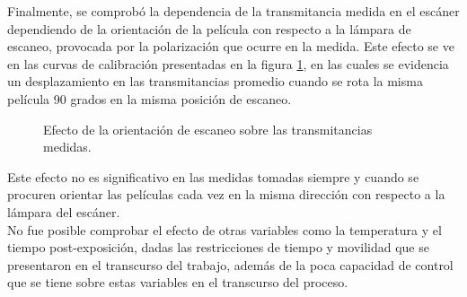 Finalmente, se comprobó la dependencia de la transmitancia medida en el escáner dependiendo de la orientación de la película con respecto a la lámpara de escaneo, provocada por la polarización que ocurre en la medida. Este efecto se ve en las curvas de calibración presentadas en la figura \ref{fig:efectoOrientacion}, en las cuales se evidencia un desplazamiento en las transmitancias promedio cuando se rota la misma película 90 grados en la misma posición de escaneo.\\
\begin{figure}[H]
	\centering
	\hfill
	\caption{Efecto de la orientación de escaneo sobre las transmitancias medidas.}
	\label{fig:efectoOrientacion}
\end{figure}
Este efecto no es significativo en las medidas tomadas siempre y cuando se procuren orientar las películas cada vez en la misma dirección con respecto a la lámpara del escáner.\\

No fue posible comprobar el efecto de otras variables como la temperatura y el tiempo post-exposición, dadas las restricciones de tiempo y movilidad que se presentaron en el transcurso del trabajo, además de la poca capacidad de control que se tiene sobre estas variables en el transcurso del proceso.\\

